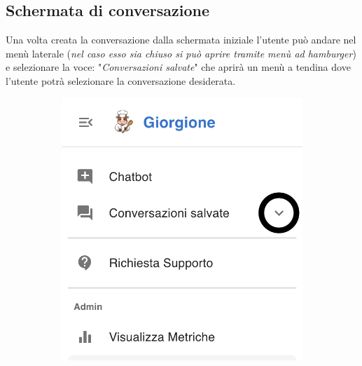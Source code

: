 \subsection{Schermata di conversazione}
Una volta creata la conversazione dalla schermata iniziale l'utente può andare nel menù laterale (\textit{nel caso esso sia chiuso si può aprire tramite menù ad hamburger}) e selezionare la voce: "\textit{Conversazioni salvate}" che aprirà un menù a tendina dove l'utente potrà selezionare la conversazione desiderata.
\begin{figure}[h!]
    \centering
    \begin{subfigure}{0.3\textwidth}
        \centering
        \includegraphics[width=\textwidth]{./img/laterale1.png}
    \end{subfigure}
    \hspace{0.05\textwidth}
    \begin{subfigure}{0.3\textwidth}
        \centering

\end{subfigure}
\end{figure}
